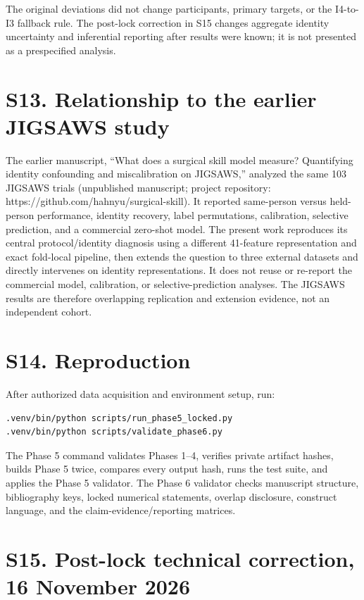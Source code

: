 \documentclass[11pt]{article}
\begin{document}
The original deviations did not change participants, primary targets, or
the I4-to-I3 fallback rule. The post-lock correction in S15 changes
aggregate identity uncertainty and inferential reporting after results
were known; it is not presented as a prespecified analysis.

\section{S13. Relationship to the earlier JIGSAWS
study}\label{s13.-relationship-to-the-earlier-jigsaws-study}

The earlier manuscript, ``What does a surgical skill model measure?
Quantifying identity confounding and miscalibration on JIGSAWS,''
analyzed the same 103 JIGSAWS trials (unpublished manuscript; project
repository: https://github.com/hahnyu/surgical-skill). It reported
same-person versus held-person performance, identity recovery, label
permutations, calibration, selective prediction, and a commercial
zero-shot model. The present work reproduces its central
protocol/identity diagnosis using a different 41-feature representation
and exact fold-local pipeline, then extends the question to three
external datasets and directly intervenes on identity representations.
It does not reuse or re-report the commercial model, calibration, or
selective-prediction analyses. The JIGSAWS results are therefore
overlapping replication and extension evidence, not an independent
cohort.

\section{S14. Reproduction}\label{s14.-reproduction}

After authorized data acquisition and environment setup, run:

\begin{verbatim}
.venv/bin/python scripts/run_phase5_locked.py
.venv/bin/python scripts/validate_phase6.py
\end{verbatim}

The Phase 5 command validates Phases 1--4, verifies private artifact
hashes, builds Phase 5 twice, compares every output hash, runs the test
suite, and applies the Phase 5 validator. The Phase 6 validator checks
manuscript structure, bibliography keys, locked numerical statements,
overlap disclosure, construct language, and the claim-evidence/reporting
matrices.

\section{S15. Post-lock technical correction, 16 November
2026}\label{s15.-post-lock-technical-correction-16-november-2026}
\end{document}

